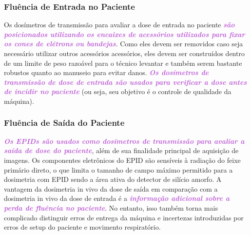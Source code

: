 \documentclass[11pt,a4paper]{article}
\begin{document}
\subsubsection*{Fluência de Entrada no Paciente}

	Os dosímetros de transmissão para avaliar a dose de entrada no paciente \textcolor{MediumOrchid}{\textbf{\textit{são posicionados utilizando os encaixes de acessórios utilizados para fixar os cones de elétrons ou bandejas}}}. Como eles devem ser removidos caso seja necessário utilizar outros acessórios acessórios, eles devem ser construídos dentro de um limite de peso razoável para o técnico levantar e também serem bastante robustos quanto ao manuseio para evitar danos. \textcolor{MediumOrchid}{\textbf{\textit{Os dosímetros de transmissão de dose de entrada são usados para verificar a dose antes de incidir no paciente}}} (ou seja, seu objetivo é o controle de qualidade da máquina).

\subsubsection*{Fluência de Saída do Paciente}

\textcolor{MediumOrchid}{\textbf{\textit{Os EPIDs são usados como dosímetros de transmissão para avaliar a saída de dose do paciente}}}, além de sua finalidade principal de aquisição de imagens. Os componentes eletrônicos do EPID são sensíveis à radiação do feixe primário direto, o que limita o tamanho de campo máximo permitido para a dosimetria com EPID sendo a área ativa do detector de silício amorfo. A vantagem da dosimetria in vivo da dose de saída em comparação com a dosimetria in vivo da dose de entrada é a \textcolor{MediumOrchid}{\textbf{\textit{informação adicional sobre a perda de fluência no paciente}}}. No entanto, isso também torna mais complicado distinguir erros de entrega da máquina e incertezas introduzidas por erros de setup do paciente e movimento respiratório.



\end{document}
